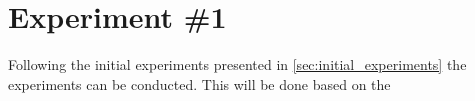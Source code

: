 \section{Experiment \#1}\label{sec:experiment_one}

Following the initial experiments presented in \cref{sec:initial_experiments} the experiments can be conducted. This will be done based on the 





